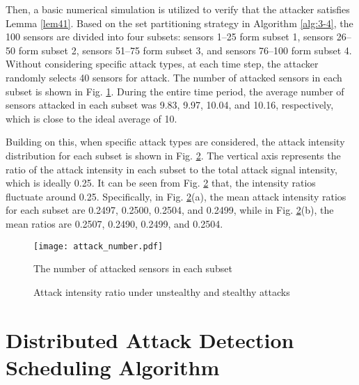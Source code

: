 Then, a basic numerical simulation is utilized to verify that the attacker satisfies Lemma \ref{lem41}. Based on the set partitioning strategy in Algorithm \ref{alg:3-4}, the 100 sensors are divided into four subsets: sensors 1–25 form subset 1, sensors 26–50 form subset 2, sensors 51–75 form subset 3, and sensors 76–100 form subset 4. Without considering specific attack types, at each time step, the attacker randomly selects 40 sensors for attack. The number of attacked sensors in each subset is shown in Fig. \ref{chapter3:attack num}. During the entire time period, the average number of sensors attacked in each subset was 9.83, 9.97, 10.04, and 10.16, respectively, which is close to the ideal average of 10.

Building on this, when specific attack types are considered, the attack intensity distribution for each subset is shown in Fig. \ref{chapter3:attack density}. The vertical axis represents the ratio of the attack intensity in each subset to the total attack signal intensity, which is ideally 0.25. It can be seen from Fig. \ref{chapter3:attack density} that, the intensity ratios fluctuate around 0.25. Specifically, in Fig. \ref{chapter3:attack density}(a), the mean attack intensity ratios for each subset are 0.2497, 0.2500, 0.2504, and 0.2499, while in Fig. \ref{chapter3:attack density}(b), the mean ratios are 0.2507, 0.2490, 0.2499, and 0.2504.

\begin{figure}[ht] \centering \texttt{[image: attack\_number.pdf]} \caption{The number of attacked sensors in each subset} \label{chapter3:attack num} \end{figure}

\begin{figure}[ht] \centering \begin{minipage}{\linewidth}   \caption{Attack intensity ratio under unstealthy and stealthy attacks} \label{chapter3:attack density} \end{minipage} \end{figure}

\section{Distributed Attack Detection Scheduling Algorithm}

